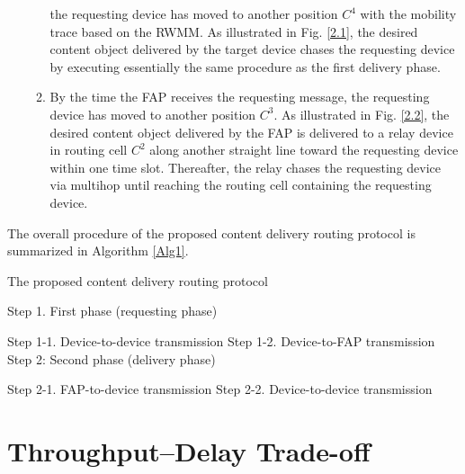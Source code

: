 \documentclass[10pt,journal,compsoc,onecolumn]{IEEEtran}
\newlength\myindent
\newcommand\bindent{%
  \begingroup
  \setlength{\itemindent}{\myindent}
  \addtolength{\algorithmicindent}{\myindent}
}
\newcommand\eindent{\endgroup}
\begin{document}
\begin{enumerate}[leftmargin=0.325cm, labelsep=0.325cm, align=left, itemsep=-0.1cm, font=\normalfont, label=(\roman*)]
\begin{enumerate}
the requesting device has moved to another position $C^{4}$ with the
mobility trace based on the RWMM. As illustrated in Fig.
\ref{2.1}, the desired content object delivered by the target device
chases the requesting device by executing essentially the same
procedure as the first delivery phase. \vspace{0.15cm} \item By
the time the FAP receives the requesting message, the requesting
device has moved to another position $C^{3}$. As illustrated in Fig.
\ref{2.2}, the desired content object delivered by the FAP is
delivered to a relay device in routing cell $C^{2}$ along another
straight line toward the requesting device within one time slot.
Thereafter, the relay chases the requesting device via multihop
until reaching the routing cell containing the requesting device. 
\end{enumerate}
\end{enumerate}
\par 
The overall procedure of the proposed content delivery routing protocol is summarized in Algorithm \ref{Alg1}.

\begin{algorithm}[t!]
\caption{The proposed content delivery routing protocol}\label{Alg1}
\begin{algorithmic}[1]
\STATE Step 1. First phase (requesting phase)
\bindent
\STATE Step 1-1. Device-to-device transmission
\STATE Step 1-2. Device-to-FAP transmission
\ENDIF
\eindent
\STATE Step 2: Second phase (delivery phase)
\bindent
{}
\STATE Step 2-1. FAP-to-device transmission
\ENDIF
\STATE Step 2-2. Device-to-device transmission
\eindent
\end{algorithmic}
\end{algorithm}

\section{Throughput--Delay Trade-off}
\end{document}
